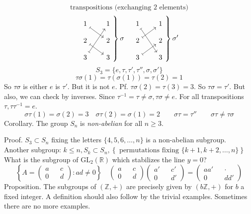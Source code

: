 \documentclass[12pt]{article}
\newcommand{\RR}{\mathbb{R}}
\newcommand{\GL}{\text{GL}}
\newcommand{\inv}[1]{#1^{-1}}
\theoremstyle{definition}
\begin{document}
\[\text{transpositions (exchanging 2 elements)}\]
\[
\left.\begin{tikzcd}[nodes={inner sep=4pt}, column sep=2em, row sep=1em]
	1 & 1 \\
	2 & 2 \\
	3 & 3
	\arrow[from=1-1, to=2-2, maps to]
	\arrow[from=2-1, to=3-2, maps to]
	\arrow[from=3-1, to=1-2, maps to]
\end{tikzcd}\right\}\sigma\quad
\left.\begin{tikzcd}[nodes={inner sep=4pt}, column sep=2em, row sep=1em]
	1 & 1 \\
	2 & 2 \\
	3 & 3
	\arrow[from=1-1, to=3-2, maps to]
	\arrow[from=2-1, to=1-2, maps to]
	\arrow[from=3-1, to=2-2, maps to]
\end{tikzcd}\right\}\sigma'
\]
\[S_3 = \{e, \tau, \tau', \tau'', \sigma, \sigma'\}\]
\[\tau\sigma(1)=\tau(\sigma(1))=\tau(2)=1\]
So \(\tau\sigma\) is either \(e\) is \(\tau'\). But it is not \(e\). Pf. \(\tau\sigma(2)=\tau(3)=3\). So \(\tau\sigma=\tau'\).
But also, we can check by inverses. Since \(\inv{\tau}=\tau\ne\sigma, \tau\sigma\ne e\).
For all transpositions \(\tau, \tau\inv{\tau}=e\).
\[\sigma\tau(1)=\sigma(2)=3\quad\sigma\tau(2)=\sigma(1)=2\qquad\sigma\tau=\tau''\qquad\sigma\tau\ne\tau\sigma\]
Corollary. The group \(S_n\) is \emph{non-abelian} for all \(n \ge 3\).

Proof. \(S_3\subset S_n\) fixing the letters \(\{4, 5, 6, \ldots, n\}\) is a non-abelian subgroup.
\\
Another subgroup: \(k \le n, S_k \subset S_n, \left\{\text{ permutations fixing } \{k+1, k+2, \ldots, n\} \right\}\)
\\
What is the subgroup of \(\GL_2(\RR)\) which stabilizes the line \(y = 0\)?
\[
    \left\{A = \begin{pmatrix}
        a && c\\
        0 && d
    \end{pmatrix} : ad \ne 0\right\}\quad
    \begin{pmatrix}
        a && c\\
        0 && d
    \end{pmatrix}
    \begin{pmatrix}
        a' && c'\\
        0 && d'
    \end{pmatrix} =
    \begin{pmatrix}
        aa'  && \cdot  \\
        0 && dd'
    \end{pmatrix}
\]
Proposition. The subgroups of \((\mathbb{Z}, +)\) are precisely given by \((b\mathbb{Z}, +)\) for \(b\) a fixed integer.
A definition should also follow by the trivial examples. Sometimes there are no more examples.
\end{document}

